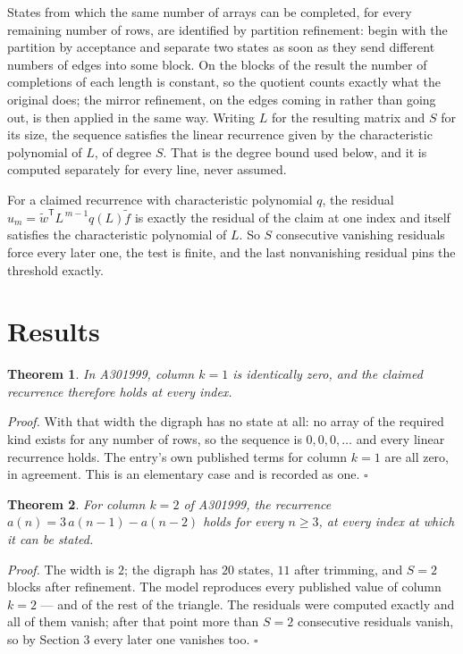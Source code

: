 \documentclass[11pt]{article}
\newtheorem{theorem}{Theorem}
\theoremstyle{definition}
\begin{document}
States from which the same number of arrays can be completed, for every remaining number of rows, are identified by partition refinement: begin with the partition by acceptance and separate two states as soon as they send different numbers of edges into some block. On the blocks of the result the number of completions of each length is constant, so the quotient counts exactly what the original does; the mirror refinement, on the edges coming in rather than going out, is then applied in the same way. Writing $L$ for the resulting matrix and $S$ for its size, the sequence satisfies the linear recurrence given by the characteristic polynomial of $L$, of degree $S$. That is the degree bound used below, and it is computed separately for every line, never assumed.

For a claimed recurrence with characteristic polynomial $q$, the residual $u_m = \tilde w^{\mathsf T}L^{\,m-1}q(L)\tilde f$ is exactly the residual of the claim at one index and itself satisfies the characteristic polynomial of $L$. So $S$ consecutive vanishing residuals force every later one, the test is finite, and the last nonvanishing residual pins the threshold exactly.

\section{Results}

\begin{theorem} In A301999, column $k = 1$ is identically zero, and the claimed recurrence therefore holds at every index.\end{theorem}

{\itshape Proof.} With that width the digraph has no state at all: no array of the required kind exists for any number of rows, so the sequence is $0,0,0,\dots$ and every linear recurrence holds. The entry's own published terms for column $k = 1$ are all zero, in agreement. This is an elementary case and is recorded as one. $\square$

\begin{theorem} For column $k = 2$ of A301999, the recurrence $a(n) = 3\,a(n-1) - a(n-2)$ holds for every $n \ge 3$, at every index at which it can be stated.\end{theorem}

{\itshape Proof.} The width is $2$; the digraph has $20$ states, $11$ after trimming, and $S = 2$ blocks after refinement. The model reproduces every published value of column $k = 2$ --- and of the rest of the triangle. The residuals were computed exactly and all of them vanish; after that point more than $S = 2$ consecutive residuals vanish, so by Section 3 every later one vanishes too. $\square$
\end{document}
